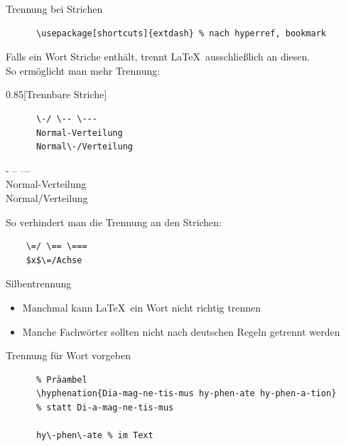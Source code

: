 \begin{frame}[fragile]{Trennung bei Strichen}
  \vspace*{-2em}
  \begin{Packages}
    \begin{lstlisting}
      \usepackage[shortcuts]{extdash} % nach hyperref, bookmark
    \end{lstlisting}
  \end{Packages}

  Falls ein Wort Striche enthält, trennt \LaTeX\ ausschließlich an diesen.\\
  So ermöglicht man mehr Trennung:
  \vspace{-0.5em}
  \begin{CodeExample}{0.85}[Trennbare Striche]
    \begin{lstlisting}
      \-/ \-- \---
      Normal-Verteilung
      Normal\-/Verteilung
    \end{lstlisting}
  \CodeResult
    - -- --- \\
    Normal-Verteilung \\
    Normal\-/Verteilung
  \end{CodeExample}

  So verhindert man die Trennung an den Strichen:
  \begin{lstlisting}
    \=/ \== \===
    $x$\=/Achse
  \end{lstlisting}
\end{frame}

\begin{frame}[fragile]{Silbentrennung}
  \begin{itemize}
    \item Manchmal kann \LaTeX\ ein Wort nicht richtig trennen
    \item Manche Fachwörter sollten nicht nach deutschen Regeln getrennt werden
  \end{itemize}
  \begin{block}{Trennung für Wort vorgeben}
    \begin{lstlisting}
      % Präambel
      \hyphenation{Dia-mag-ne-tis-mus hy-phen-ate hy-phen-a-tion}
      % statt Di-a-mag-ne-tis-mus

      hy\-phen\-ate % im Text
    \end{lstlisting}
  \end{block}
\end{frame}

